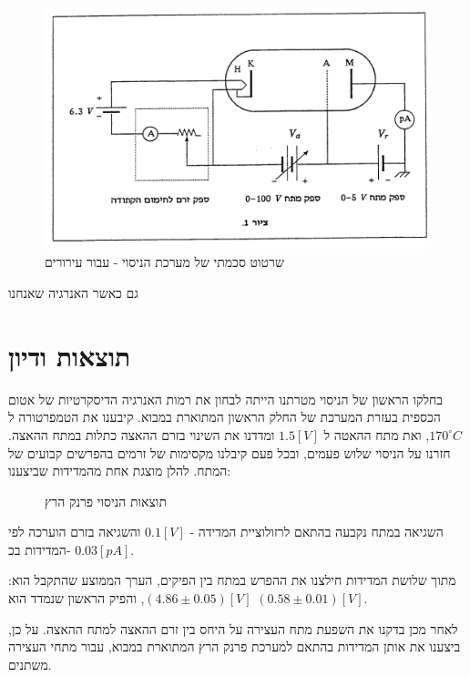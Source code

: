 \documentclass{article}
\begin{document}
\begin{figure}[H]
	\centering
	\includegraphics[width=\textwidth]{./system-scheme-excitations.png}
	\caption{שרטוט סכמתי של מערכת הניסוי - עבור עירורים}
	\label{fig:system-scheme-excitations}
\end{figure}

גם כאשר האנרגיה שאנחנו

\section{תוצאות ודיון}
בחלקו הראשון של הניסוי מטרתנו הייתה לבחון את רמות האנרגיה הדיסקרטיות של אטום הכספית בעזרת המערכת של החלק הראשון המתוארת במבוא.
קיבענו את הטמפרטורה ל
$170 ^{\circ} C$,
ואת מתח ההאטה ל
$1.5 [V]$
ומדדנו את השינוי בזרם ההאצה כתלות במתח ההאצה.
חזרנו על הניסוי שלוש פעמים, ובכל פעם קיבלנו מקסימות של זרמים בהפרשים קבועים של המתח.
להלן מוצגת אחת מהמדידות שביצענו:
 
\begin{figure}[H]
	\begin{center}
	\resizebox{\textwidth}{!}{}
	\end{center}
	\caption{תוצאות הניסוי פרנק הרץ}
	\label{fig:first_mesurment}
\end{figure}

השגיאה במתח נקבעה בהתאם לרזולוציית המדידה - 
$0.1 [V]$
והשגיאה בזרם הוערכה לפי המדידות בכ- 
$0.03 [pA]$.


מתוך שלושת המדידות חילצנו את ההפרש במתח בין הפיקים, הערך הממוצע שהתקבל הוא:
$(4.86 \pm 0.05)[V]$,
והפיק הראשון שנמדד הוא 
$(0.58 \pm 0.01)[V]$.


לאחר מכן בדקנו את השפעת מתח העצירה על היחס בין זרם ההאצה למתח ההאצה.
על כן, ביצענו את אותן המדידות בהתאם למערכת פרנק הרץ המתוארת במבוא, עבור מתחי העצירה משתנים.
\end{document}
